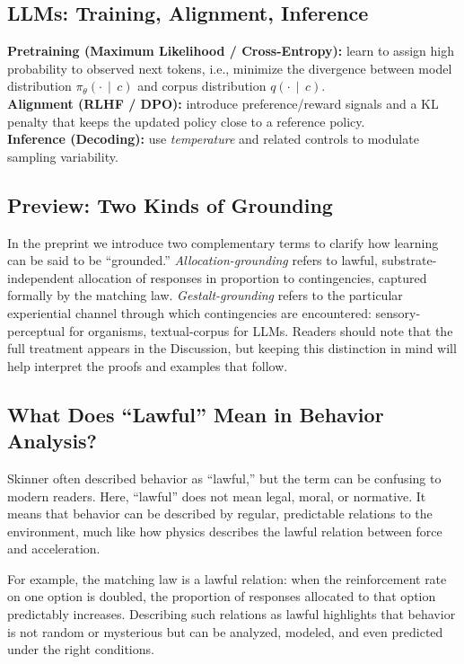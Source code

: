 \documentclass[11pt]{article}
\newcommand{\given}{\,\mid\,}
\begin{document}
\subsection{LLMs: Training, Alignment, Inference}
\textbf{Pretraining (Maximum Likelihood / Cross-Entropy):} learn to assign high probability to observed next tokens, i.e., minimize the divergence between model distribution $\pi_\theta(\cdot\given c)$ and corpus distribution $q(\cdot\given c)$.\\
\textbf{Alignment (RLHF / DPO):} introduce preference/reward signals and a KL penalty that keeps the updated policy close to a reference policy.\\
\textbf{Inference (Decoding):} use \emph{temperature} and related controls to modulate sampling variability.

\subsection*{Preview: Two Kinds of Grounding}

In the preprint we introduce two complementary terms to clarify how learning can
be said to be ``grounded.'' \emph{Allocation-grounding} refers to lawful,
substrate-independent allocation of responses in proportion to contingencies,
captured formally by the matching law. \emph{Gestalt-grounding} refers to the
particular experiential channel through which contingencies are encountered:
sensory-perceptual for organisms, textual-corpus for LLMs. Readers should note
that the full treatment appears in the Discussion, but keeping this distinction
in mind will help interpret the proofs and examples that follow.

\subsection*{What Does ``Lawful'' Mean in Behavior Analysis?}

Skinner often described behavior as ``lawful,'' but the term can be confusing
to modern readers. Here, ``lawful'' does not mean legal, moral, or normative. It
means that behavior can be described by regular, predictable relations to the
environment, much like how physics describes the lawful relation between force
and acceleration. 

For example, the matching law is a lawful relation: when the reinforcement rate
on one option is doubled, the proportion of responses allocated to that option
predictably increases. Describing such relations as lawful highlights that
behavior is not random or mysterious but can be analyzed, modeled, and even
predicted under the right conditions.
\end{document}
